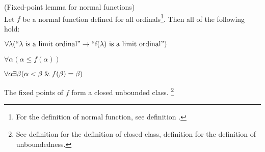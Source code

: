 % 
%
%

\begin{lemma}{(Fixed-point lemma for normal functions)}\label{lemma:normal_fixed_point}\\
Let $f$ be a normal function defined for all ordinals\footnote{For the definition of normal function, see definition .}. Then all of the following hold:
\bce[(i)]
\item $\forall \lambda(\mbox{``$\lambda$ is a limit ordinal''} \rightarrow \mbox{``f($\lambda$) is a limit ordinal''})$
\item $\forall \alpha (\alpha \leq f(\alpha))$
\item $\forall \alpha \exists \beta (\alpha < \beta \mathrel{\&} f(\beta) = \beta)$
\item The fixed points of $f$ form a closed unbounded class.
\footnote{See definition  for the definition of closed class,  definition  for the definition of unboundedness.}
\ece
\end{lemma}

